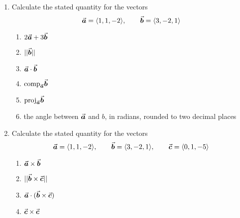 \begin{enumerate}
\item Calculate the stated quantity for the vectors
\[
\a = \<1, 1, -2\>, \qquad \b = \<3, -2, 1\>%
\]
\begin{enumerate}
\item \(2\a + 3\b\) \label{prob11a}%
\item \(||\b||\) \label{prob11b}%
\item \(\a \cdot \b\) \label{prob11c}%
\item \(\text{comp}_{\a} \b\) \label{prob11i}%
\item \(\text{proj}_{\a} \b\) \label{prob11j}%
\item the angle between \(\a\) and \(b\), in radians, rounded to two decimal places \label{prob11k}%
\end{enumerate}


%
%

\item Calculate the stated quantity for the vectors
\[
\a = \<1, 1, -2\>, \qquad \b = \<3, -2, 1\>, \qquad \c = \< 0, 1, -5\>
\]
\begin{enumerate}
\item \(\a \times \b\) \label{prob10-4d}%
\item \(|| \b  \times \c||\) \label{prob10-4e}%
\item \(\a \cdot (\b \times \c)\) \label{prob10-4f}%
\item \(\c \times \c\) \label{prob10-4g}%
\end{enumerate}



\end{enumerate}
